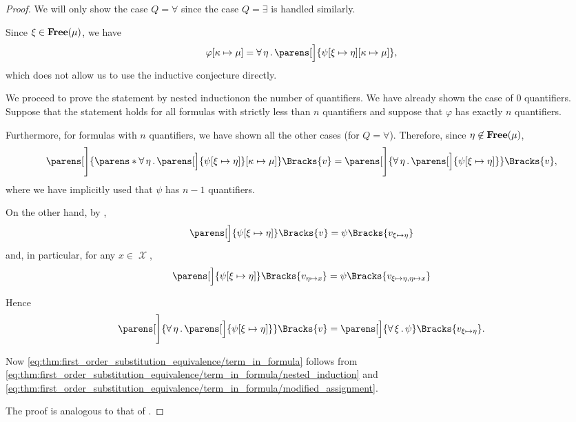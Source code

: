 \begin{proof}
  We will only show the case \( Q = \forall \) since the case \( Q = \exists \) is handled similarly.

  Since \( \xi \in \operatorname{\mathbf{Free}}(\mu) \), we have
  \begin{equation*}
    \varphi[\kappa \mapsto \mu]
    =
    \qforall{\eta} \parens[\Big]{ \psi[\xi \mapsto \eta][\kappa \mapsto \mu] },
  \end{equation*}
  which does not allow us to use the inductive conjecture directly.

  We proceed to prove the statement by nested induction\IND on the number of quantifiers. We have already shown the case of \( 0 \) quantifiers. Suppose that the statement holds for all formulas with strictly less than \( n \) quantifiers and suppose that \( \varphi \) has exactly \( n \) quantifiers.

  Furthermore, for formulas with \( n \) quantifiers, we have shown all the other cases (for \( Q = \forall \)). Therefore, since \( \eta \not\in \operatorname{\mathbf{Free}}(\mu) \),
  \begin{equation}\label{eq:thm:first_order_substitution_equivalence/term_in_formula/nested_induction}
    \parens[\Bigg]{ \parens*{ \qforall{\eta} \parens[\Big]{ \psi[\xi \mapsto \eta] } }[\kappa \mapsto \mu] }\Bracks{v}
    =
    \parens[\Bigg]{\qforall{\eta} \parens[\Big]{ \psi[\xi \mapsto \eta] } }\Bracks{v},
  \end{equation}
  where we have implicitly used that \( \psi \) has \( n - 1 \) quantifiers.

  On the other hand, by ,
  \begin{equation*}
    \parens[\Big]{ \psi[\xi \mapsto \eta] }\Bracks{v} = \psi\Bracks{v_{\xi \mapsto \eta}}
  \end{equation*}
  and, in particular, for any \( x \in \mscrX \),
  \begin{equation*}
    \parens[\Big]{ \psi[\xi \mapsto \eta] }\Bracks{v_{\eta \mapsto x}} = \psi\Bracks{v_{\xi \mapsto \eta,\eta \mapsto x}}
  \end{equation*}

  Hence
  \begin{equation}\label{eq:thm:first_order_substitution_equivalence/term_in_formula/modified_assignment}
    \parens[\Bigg]{\qforall{\eta} \parens[\Big]{ \psi[\xi \mapsto \eta] } }\Bracks{v}
    =
    \parens[\Big]{\qforall{\xi} \psi }\Bracks{v_{\xi \mapsto \eta}}.
  \end{equation}

  Now \eqref{eq:thm:first_order_substitution_equivalence/term_in_formula} follows from \eqref{eq:thm:first_order_substitution_equivalence/term_in_formula/nested_induction} and \eqref{eq:thm:first_order_substitution_equivalence/term_in_formula/modified_assignment}.

   The proof is analogous to that of .
\end{proof}
